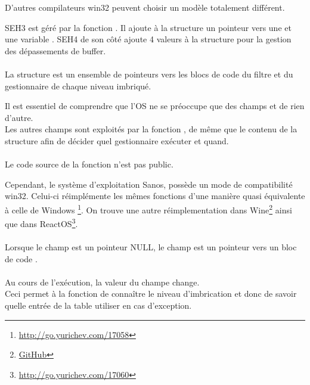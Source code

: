 D'autres compilateurs win32 peuvent choisir un modèle totalement différent.


SEH3 est géré par la fonction . Il ajoute à la structure  
un pointeur vers une  et une variable .
SEH4 de son côté ajoute 4 valeurs à la structure  pour la gestion des dépassements 
de buffer.\\
\\
La structure  est un ensemble de pointeurs vers les blocs de code du filtre et du 
gestionnaire de chaque niveau  imbriqué.



Il est essentiel de comprendre que l'\ac{OS} ne se préoccupe que des champs  et de 
rien d'autre.\\
Les autres champs sont exploités par la fonction , de même que le contenu 
de la structure  afin de décider quel gestionnaire exécuter et quand.\\
\\
Le code source de la fonction  n'est pas public.

Cependant, le système d'exploitation Sanos, possède un mode de compatibilité win32.
Celui-ci réimplémente les mêmes fonctions d'une manière quasi équivalente à celle de Windows
\footnote{\url{http://go.yurichev.com/17058}}.
On trouve une autre réimplementation dans Wine\footnote{\href{http://go.yurichev.com/17059}{GitHub}}
ainsi que dans ReactOS\footnote{\url{http://go.yurichev.com/17060}}.\\
\\
Lorsque le champ  est un pointeur NULL, le champ  est un pointeur vers un 
bloc de code .\\
\\
Au cours de l'exécution, la valeur du champe  change. \\
Ceci permet à la 
fonction  de connaître le niveau d'imbrication et donc de savoir quelle 
entrée de la table  utiliser en cas d'exception.






